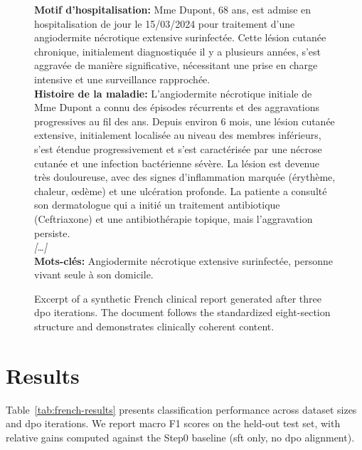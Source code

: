 \begin{figure}[htb]
\centering
\begin{tcolorbox}[colback=gray!5,colframe=gray!50,boxrule=0.5pt,arc=2pt,left=8pt,right=8pt,top=6pt,bottom=6pt,fontupper=\small]
\textbf{Motif d'hospitalisation:}
Mme Dupont, 68 ans, est admise en hospitalisation de jour le 15/03/2024 pour traitement d'une angiodermite nécrotique extensive surinfectée. Cette lésion cutanée chronique, initialement diagnostiquée il y a plusieurs années, s'est aggravée de manière significative, nécessitant une prise en charge intensive et une surveillance rapprochée.\\[0.5em]

\textbf{Histoire de la maladie:}
L'angiodermite nécrotique initiale de Mme Dupont a connu des épisodes récurrents et des aggravations progressives au fil des ans. Depuis environ 6 mois, une lésion cutanée extensive, initialement localisée au niveau des membres inférieurs, s'est étendue progressivement et s'est caractérisée par une nécrose cutanée et une infection bactérienne sévère. La lésion est devenue très douloureuse, avec des signes d'inflammation marquée (érythème, chaleur, \oe{}dème) et une ulcération profonde. La patiente a consulté son dermatologue qui a initié un traitement antibiotique (Ceftriaxone) et une antibiothérapie topique, mais l'aggravation persiste.\\[0.5em]

\textit{[\ldots]}\\[0.5em]

\textbf{Mots-clés:} Angiodermite nécrotique extensive surinfectée, personne vivant seule à son domicile.
\end{tcolorbox}
\caption{Excerpt of a synthetic French clinical report generated after three \gls{dpo} iterations. The document follows the standardized eight-section structure and demonstrates clinically coherent content.}
\label{fig:french-example}
\end{figure}

\section{Results}
\label{sec:french-results}

Table~\ref{tab:french-results} presents classification performance across dataset sizes and \gls{dpo} iterations.
We report macro F1 scores on the held-out test set, with relative gains computed against the Step0 baseline (\gls{sft} only, no \gls{dpo} alignment).

